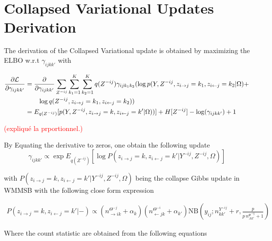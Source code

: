 



\section{Collapsed Variational Updates Derivation}

The derivation of the Collapsed Variational update is obtained by maximizing the ELBO w.r.t $\gamma_{ijkk'}$ with 

\begin{align*}
\frac{\partial \mathcal{L}}{\partial \gamma_{ijkk'}} &= \frac{\partial }{\partial \gamma_{ijkk'}}  \sum_{Z^{-ij}}\sum_{k_1=1}^K\sum_{k_2=1}^K  q(Z^{-ij}) \gamma_{ijk_1 k_2} (\log p(Y, Z^{-ij}, z_{i\rightarrow j}=k_1, z_{i\leftarrow j}=k_2|\Omega)+ \\
& \qquad \log q(Z^{-ij}, z_{i\rightarrow j}=k_1, z_{i\leftarrow j}=k_2) )   \\
&= E_{q(Z^{-ij})}[ p(Y, Z^{-ij}, z_{i\rightarrow j}=k, z_{i\leftarrow j}=k'|\Omega))] + H[Z^{-ij}] -\log(\gamma_{ijkk'}) +1
\end{align*}

\textcolor{red}{(expliqué la prportionnel.)}

By Equating the derivative to zeros, one obtain the following update
\begin{equation} \label{eq1}
\gamma_{ijkk'} \propto \exp E_{q(Z^{-ij})} [\log P(z_{i\rightarrow j}=k, z_{i\leftarrow j}=k' | Y^{-ij}, Z^{-ij}, \Omega) ]
\end{equation}

with  $P(z_{i\rightarrow j}=k, z_{i\leftarrow j}=k' | Y^{-ij}, Z^{-ij}, \Omega)$ being the collapse Gibbs update in WMMSB with the following close form expression

\begin{align*}
P(z_{i\rightarrow j}=k, z_{i\leftarrow j}=k' |-) \propto (n_{\rightarrow ik}^{\Theta^{-j}} + \alpha_k) (n_{\leftarrow jk}^{\Theta^{-i}} + \alpha_{k'}) \mathrm{NB}\left(y_{ij}; n^{Y^{-ij}}_{kk'} + r, \frac{p}{p\,n^{\Phi^{-ij}}_{\bm{.}kk'} + 1} \right)
\end{align*}

Where the count statistic are obtained from the following equations


